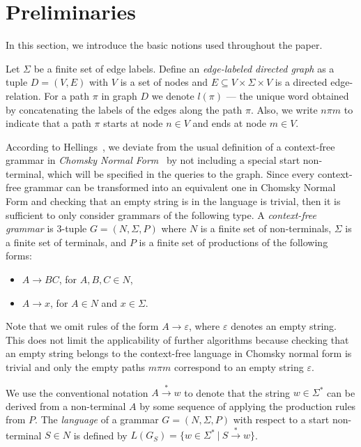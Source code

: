 \section{Preliminaries} \label{section_preliminaries}
In this section, we introduce the basic notions used throughout the paper.

Let $\Sigma$ be a finite set of edge labels. Define an \textit{edge-labeled directed graph} as a tuple $D = (V, E)$ with $V$ is a set of nodes and $E \subseteq V \times \Sigma \times V$ is a directed edge-relation.  For a path $\pi$ in graph $D$ we denote $l(\pi)$ --- the unique word obtained by concatenating the labels of the edges along the path $\pi$. Also, we write $n \pi m$ to indicate that a path $\pi$ starts at node $n \in V$ and ends at node $m \in V$.

According to Hellings~\cite{hellingsRelational}, we deviate from the usual definition of a context-free grammar in \textit{Chomsky Normal Form}~\cite{chomsky} by not including a special start non-terminal, which will be specified in the queries to the graph. Since every context-free grammar can be transformed into an equivalent one in Chomsky Normal Form and checking that an empty string is in the language is trivial, then it is sufficient to only consider grammars of the following type. A \textit{context-free grammar} is 3-tuple $G = (N, \Sigma, P)$ where $N$ is a finite set of non-terminals, $\Sigma$ is a finite set of terminals, and $P$ is a finite set of productions of the following forms:

\begin{itemize}
    \item $A \rightarrow B C$, for $A,B,C \in N$,
    \item $A \rightarrow x$, for $A \in N$ and $x \in \Sigma$.   
\end{itemize}

Note that we omit rules of the form $A \rightarrow \varepsilon$, where $\varepsilon$ denotes an empty string. This does not limit the applicability of further algorithms because checking that an empty string belongs to the context-free language in Chomsky normal form is trivial and only the empty paths $m \pi m$ correspond to an empty string $\varepsilon$.

We use the conventional notation $A \xrightarrow{*} w$ to denote that the string $w \in \Sigma^*$ can be derived from a non-terminal $A$ by some sequence of applying the production rules from $P$. The \textit{language} of a grammar $G = (N,\Sigma,P)$ with respect to a start non-terminal $S \in N$ is defined by $L(G_S) = \{w \in \Sigma^*~|~S \xrightarrow{*} w\}$.

